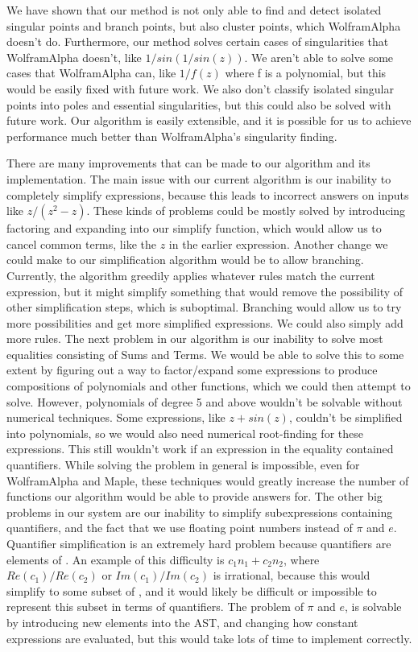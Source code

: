 We have shown that our method is not only able to find and detect isolated singular points and branch points, but also cluster points, which WolframAlpha doesn't do. Furthermore, our method solves certain cases of singularities that WolframAlpha doesn't, like $1/sin(1/sin(z))$. We aren't able to solve some cases that WolframAlpha can, like $1/f(z)$ where f is a polynomial, but this would be easily fixed with future work. We also don't classify isolated singular points into poles and essential singularities, but this could also be solved with future work. Our algorithm is easily extensible, and it is possible for us to achieve performance much better than WolframAlpha's singularity finding.

There are many improvements that can be made to our algorithm and its implementation. The main issue with our current algorithm is our inability to completely simplify expressions, because this leads to incorrect answers on inputs like $z/(z^2-z)$. These kinds of problems could be mostly solved by introducing factoring and expanding into our simplify function, which would allow us to cancel common terms, like the $z$ in the earlier expression. Another change we could make to our simplification algorithm would be to allow branching. Currently, the algorithm greedily applies whatever rules match the current expression, but it might simplify something that would remove the possibility of other simplification steps, which is suboptimal. Branching would allow us to try more possibilities and get more simplified expressions. We could also simply add more rules. The next problem in our algorithm is our inability to solve most equalities consisting of Sums and Terms. We would be able to solve this to some extent by figuring out a way to factor/expand some expressions to produce compositions of polynomials and other functions, which we could then attempt to solve. However, polynomials of degree 5 and above wouldn't be solvable without numerical techniques. Some expressions, like $z+sin(z)$, couldn't be simplified into polynomials, so we would also need numerical root-finding for these expressions. This still wouldn't work if an expression in the equality contained quantifiers. While solving the problem in general is impossible, even for WolframAlpha and Maple, these techniques would greatly increase the number of functions our algorithm would be able to provide answers for. The other big problems in our system are our inability to simplify subexpressions containing quantifiers, and the fact that we use floating point numbers instead of $\pi$ and $e$. Quantifier simplification is an extremely hard problem because quantifiers are elements of \ZZ. An example of this difficulty is $c_1n_1+c_2n_2$, where $Re(c_1)/Re(c_2)$ or $Im(c_1)/Im(c_2)$ is irrational, because this would simplify to some subset of \CC, and it would likely be difficult or impossible to represent this subset in terms of quantifiers. The problem of $\pi$ and $e$, is solvable by introducing new elements into the AST, and changing how constant expressions are evaluated, but this would take lots of time to implement correctly.
